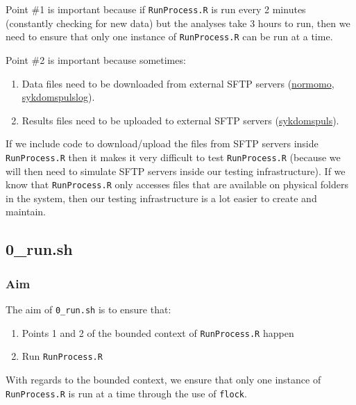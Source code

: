 \documentclass[12pt,]{article}
\providecommand{\tightlist}{%
  \setlength{\itemsep}{0pt}\setlength{\parskip}{0pt}}
\begin{document}
Point \#1 is important because if \texttt{RunProcess.R} is run every 2
minutes (constantly checking for new data) but the analyses take 3 hours
to run, then we need to ensure that only one instance of
\texttt{RunProcess.R} can be run at a time.

Point \#2 is important because sometimes:

\begin{enumerate}
\def\labelenumi{\arabic{enumi}.}
\tightlist
\item
  Data files need to be downloaded from external SFTP servers
  (\href{https://folkehelseinstituttet.github.io/dashboards_normomo/}{normomo},
  \href{https://folkehelseinstituttet.github.io/dashboards_sykdomspuls_log/}{sykdomspulslog}).
\item
  Results files need to be uploaded to external SFTP servers
  (\href{https://folkehelseinstituttet.github.io/dashboards_sykdomspuls/}{sykdomspuls}).
\end{enumerate}

If we include code to download/upload the files from SFTP servers inside
\texttt{RunProcess.R} then it makes it very difficult to test
\texttt{RunProcess.R} (because we will then need to simulate SFTP
servers inside our testing infrastructure). If we know that
\texttt{RunProcess.R} only accesses files that are available on physical
folders in the system, then our testing infrastructure is a lot easier
to create and maintain.

\subsection{0\_run.sh}\label{run.sh}

\subsubsection{Aim}\label{aim-1}

The aim of \texttt{0\_run.sh} is to ensure that:

\begin{enumerate}
\def\labelenumi{\arabic{enumi}.}
\tightlist
\item
  Points 1 and 2 of the bounded context of \texttt{RunProcess.R} happen
\item
  Run \texttt{RunProcess.R}
\end{enumerate}

With regards to the bounded context, we ensure that only one instance of
\texttt{RunProcess.R} is run at a time through the use of
\texttt{flock}.
\end{document}
